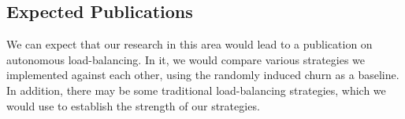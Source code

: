 \subsection{Expected Publications}
We can expect that our research in this area would lead to a publication on autonomous load-balancing.
In it, we would compare various strategies we implemented against each other, using the randomly induced churn as a baseline.
In addition, there may be some traditional load-balancing strategies, which we would use to establish the strength of our strategies.




